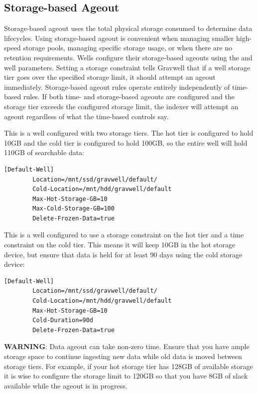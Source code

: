 {{\subsection{Storage-based Ageout}

Storage-based ageout uses the total physical storage consumed to
determine data lifecycles. Using storage-based ageout is convenient
when managing smaller high-speed storage pools, managing specific
storage usage, or when there are no retention requirements. Wells
configure their storage-based ageouts using the
 and  well parameters.
Setting a storage constraint tells Gravwell that if a well storage tier
goes over the specified storage limit, it should attempt an ageout
immediately. Storage-based ageout rules operate entirely independently
of time-based rules. If both time- and storage-based ageouts are
configured and the storage tier exceeds the configured storage limit,
the indexer will attempt an ageout regardless of what the time-based
controls say.

This is a well configured with two storage tiers. The hot tier is
configured to hold 10GB and the cold tier is configured to hold 100GB,
so the entire well will hold 110GB of searchable data:

\begin{Verbatim}[breaklines=true]
[Default-Well]
        Location=/mnt/ssd/gravwell/default/
        Cold-Location=/mnt/hdd/gravwell/default
        Max-Hot-Storage-GB=10
        Max-Cold-Storage-GB=100
        Delete-Frozen-Data=true
\end{Verbatim}

This is a well configured to use a storage constraint on the hot tier
and a time constraint on the cold tier. This means it will keep 10GB in
the hot storage device, but ensure that data is held for at least 90
days using the cold storage device:

\begin{Verbatim}[breaklines=true]
[Default-Well]
        Location=/mnt/ssd/gravwell/default/
        Cold-Location=/mnt/hdd/gravwell/default
        Max-Hot-Storage-GB=10
        Cold-Duration=90d
        Delete-Frozen-Data=true
\end{Verbatim}

\textbf{WARNING}: Data ageout can take non-zero time. Ensure that you have
ample storage space to continue ingesting new data while old data is
moved between storage tiers. For example, if your hot storage tier has
128GB of available storage it is wise to configure the storage limit to
120GB so that you have 8GB of slack available while the ageout is in
progress.

}}
